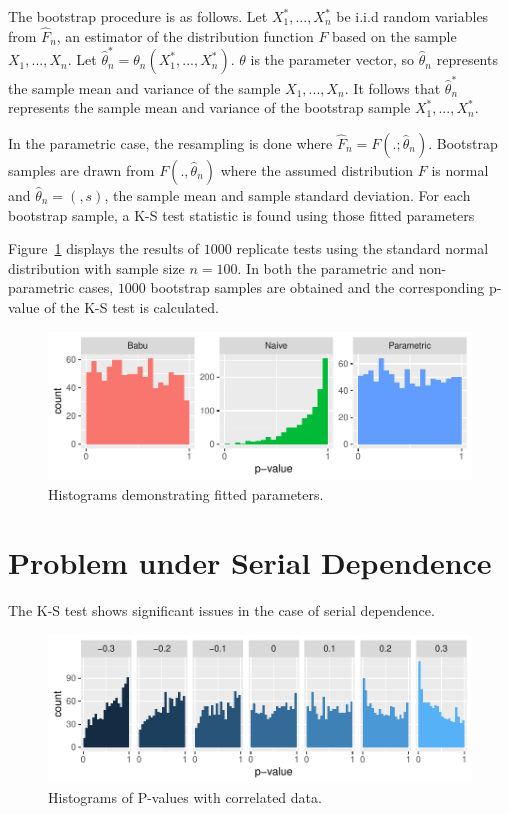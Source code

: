 \documentclass[12pt, letterpaper, titlepage]{article}
\makeatletter
\newcommand*{\Xbar}{}%
\DeclareRobustCommand*{\Xbar}{%
  \mathpalette\@Xbar{}%
}
\newcommand*{\@Xbar}[2]{%
  \sbox0{$#1\mathrm{X}\m@th$}%
  \sbox2{$#1X\m@th$}%
  \rlap{%
    \hbox to\wd2{%
      \hfill
      $\overline{%
        \vrule width 0pt height\ht0 %
        \kern\wd0 %
      }$%
    }%
  }%
  \copy2 %
}
\makeatother
\begin{document}
The bootstrap procedure is as follows. Let $X_1^*,...,X_n^*$ be i.i.d random variables from $\hat{F}_n$, an estimator of the distribution function $F$ based on the sample $X_1,...,X_n$. Let $\hat{\theta}_n^* = \theta_n(X_1^*,...,X_n^*)$. $\theta$ is the parameter vector, so $\hat{\theta}_n$ represents the sample mean and variance of the sample $X_1,...,X_n$. It follows that $\hat{\theta}_n^*$ represents the sample mean and variance of the bootstrap sample $X_1^*,...,X_n^*$.

In the parametric case, the resampling is done where $\hat{F}_n = F(.;\hat{\theta}_n)$. Bootstrap samples are drawn from ${F}(.,\hat{\theta}_n)$ where the assumed distribution $F$ is normal and $\hat{\theta}_n = (\Xbar, s)$, the sample mean and sample standard deviation. For each bootstrap sample, a K-S test statistic is found using those fitted parameters

Figure~\ref{fig:hist_fitted} displays the results of $1000$ replicate tests using the standard normal distribution with sample size $n=100$. In both the parametric and non-parametric cases, $1000$ bootstrap samples are obtained and the corresponding p-value of the K-S test is calculated. 

\begin{figure}[tbp]
  \centering
  \includegraphics{hist_fitted}
  \caption{Histograms demonstrating fitted parameters.}
  \label{fig:hist_fitted}
\end{figure}

\hypertarget{sec:correlation}{%
\section{Problem under Serial Dependence}\label{sec:correlation}}

The K-S test shows significant issues in the case of serial dependence.

\begin{figure}[tbp]
  \centering
  \includegraphics{hist_correlation}
  \caption{Histograms of P-values with correlated data.}
  \label{fig:hist_correlation}
\end{figure}
\end{document}
